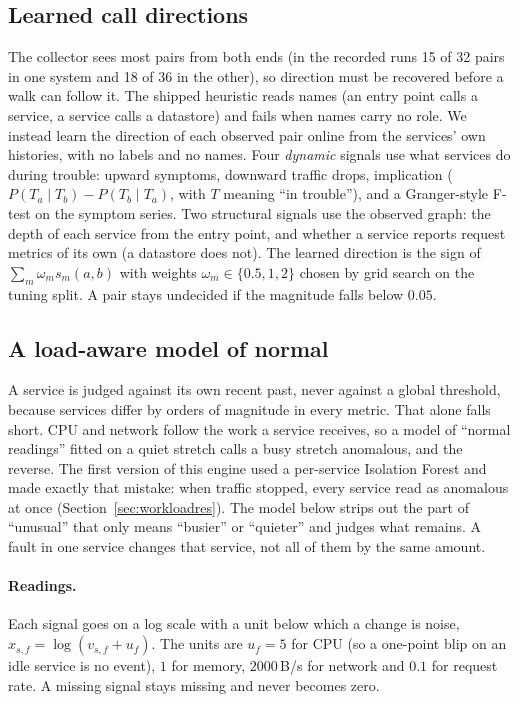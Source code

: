\subsection{Learned call directions}
\label{sec:dirs}
The collector sees most pairs from both ends (in the recorded runs 15 of 32 pairs in one system and 18 of 36 in the other), so direction must be recovered before a walk can follow it. The shipped heuristic reads names (an entry point calls a service, a service calls a datastore) and fails when names carry no role. We instead learn the direction of each observed pair online from the services' own histories, with no labels and no names. Four \emph{dynamic} signals use what services do during trouble: upward symptoms, downward traffic drops, implication ($P(T_a \mid T_b) - P(T_b \mid T_a)$, with $T$ meaning ``in trouble''), and a Granger-style F-test on the symptom series. Two structural signals use the observed graph: the depth of each service from the entry point, and whether a service reports request metrics of its own (a datastore does not). The learned direction is the sign of $\sum_m \omega_m s_m(a,b)$ with weights $\omega_m \in \{0.5, 1, 2\}$ chosen by grid search on the tuning split. A pair stays undecided if the magnitude falls below $0.05$.

\subsection{A load-aware model of normal}
\label{sec:forest}
\label{sec:load}
A service is judged against its own recent past, never against a global threshold, because services differ by orders of magnitude in every metric. That alone falls short. CPU and network follow the work a service receives, so a model of ``normal readings'' fitted on a quiet stretch calls a busy stretch anomalous, and the reverse. The first version of this engine used a per-service Isolation Forest and made exactly that mistake: when traffic stopped, every service read as anomalous at once (Section~\ref{sec:workloadres}). The model below strips out the part of ``unusual'' that only means ``busier'' or ``quieter'' and judges what remains. A fault in one service changes that service, not all of them by the same amount.

\paragraph{Readings.} Each signal goes on a log scale with a unit below which a change is noise, $x_{s,f} = \log(v_{s,f} + u_f)$. The units are $u_f = 5$ for CPU (so a one-point blip on an idle service is no event), $1$ for memory, $2000$\,B/s for network and $0.1$ for request rate. A missing signal stays missing and never becomes zero.

